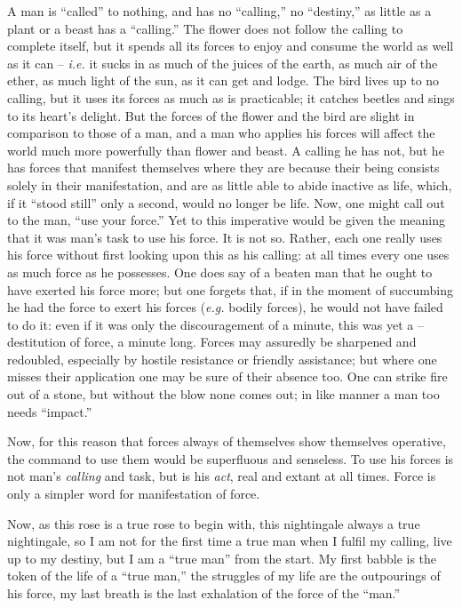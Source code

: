 A man is ``called'' to nothing, and has no ``calling,'' no ``destiny,'' 
as little as a plant or a beast has a ``calling.'' The flower does not 
follow the calling to complete itself, but it spends all its forces to enjoy 
and consume the world as well as it can -- \textit{i.e.} it sucks in as much 
of the juices of the earth, as much air of the ether, as much light of the 
sun, as it can get and lodge. The bird lives up to no calling, but it uses its 
forces as much as is practicable; it catches beetles and sings to its heart's 
delight. But the forces of the flower and the bird are slight in comparison to 
those of a man, and a man who applies his forces will affect the world much 
more powerfully than flower and beast. A calling he has not, but he has forces 
that manifest themselves where they are because their being consists solely in 
their manifestation, and are as little able to abide inactive as life, which, 
if it ``stood still'' only a second, would no longer be life. Now, one might 
call out to the man, ``use your force.'' Yet to this imperative would be 
given the meaning that it was man's task to use his force. It is not so. 
Rather, each one really uses his force without first looking upon this as his 
calling: at all times every one uses as much force as he possesses. One does 
say of a beaten man that he ought to have exerted his force more; but one 
forgets that, if in the moment of succumbing he had the force to exert his 
forces (\textit{e.g.} bodily forces), he would not have failed to do it: even 
if it was only the discouragement of a minute, this was yet a --destitution of 
force, a minute long. Forces may assuredly be sharpened and redoubled, 
especially by hostile resistance or friendly assistance; but where one misses 
their application one may be sure of their absence too. One can strike fire 
out of a stone, but without the blow none comes out; in like manner a man too 
needs ``impact.''

Now, for this reason that forces always of themselves show themselves 
operative, the command to use them would be superfluous and senseless. To use 
his forces is not man's \textit{calling} and task, but is his \textit{act}, 
real and extant at all times. Force is only a simpler word for manifestation 
of force.

Now, as this rose is a true rose to begin with, this nightingale always a true 
nightingale, so I am not for the first time a true man when I fulfil my 
calling, live up to my destiny, but I am a ``true man'' from the start. My 
first babble is the token of the life of a ``true man,'' the struggles of my 
life are the outpourings of his force, my last breath is the last exhalation 
of the force of the ``man.''

